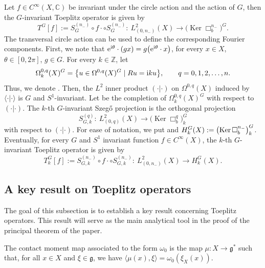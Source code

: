 \documentclass[pdftex]{sigma}
\numberwithin{equation}{section}
\newcommand{\To}{\rightarrow}
\begin{document}
	Let $f\in C^{\infty}(X, \mathbb{C})$ be invariant under the circle action and the action of $G$, then the $G$-invariant Toeplitz operator is given by
	\[T^G[f]:=S^{(n_-)}_G\circ f\cdot\circ S^{(n_-)}_G\colon\ L^2_{(0,n_-)}(X)\To\bigl(\operatorname{Ker}\Box^{n_-}_b\bigr)^G .
	\]
	The transversal circle action can be used to define the corresponding Fourier components. First, we note that
$
	{\rm e}^{{\rm i}\theta}\cdot (g x)=g \bigl( {\rm e}^{{\rm i}\theta}\cdot x\bigr)$, for every $ x\in X$, $ \theta\in[0,2\pi]$, $ g\in G$.
	For every $k\in\mathbb Z$, let
	\[\Omega^{0,q}_k(X)^G=\big\{u\in\Omega^{0,q}(X)^G \mid Ru={\rm i}k u\big\},\qquad q=0,1,2,\dots,n.
	\]
	Thus, we denote . Then, the $L^2$ inner product $( \cdot | \cdot )$ on $\Omega^{0,q}(X)$
	induced by~$\langle \cdot | \cdot \rangle$ is $G$ and $S^1$-invariant. Let  be
	the completion of $\Omega_k^{0,q}(X)^G$ with respect to~$( \cdot | \cdot )$.
	The $k$-th $G$-invariant Szeg\H{o} projection is the orthogonal projection
	\[S^{(q)}_{G,k}\colon\ L^2_{(0,q)}(X)\To \bigl(\operatorname{Ker}\Box^q_b\bigr)^G_k\]
	with respect to $( \cdot | \cdot )$. For ease of notation, we put
	and
$H^G_k(X):=\smash{\bigl(\operatorname{Ker}\Box^{n_-}_b\bigr)^G_k}$.
	Eventually, for every $G$ and $S^1$ invariant function $f\in{C}^\infty(X)$, the $k$-th $G$-invariant Toeplitz operator is given by
	\[%
		T^G_{k}[f]:=S^{(n_-)}_{G,k}\circ f\cdot\circ S^{(n_-)}_{G,k}\colon\ L^2_{(0,n_-)}(X)\To H^G_k(X) .
	\]
	
	 \subsection{A key result on Toeplitz operators}
	
	 The goal of this subsection is to establish a key result concerning Toeplitz operators. This result will serve as the main analytical tool in the proof of the principal theorem of the paper.
	
	 \begin{Definition}\label{d-gue170124}
	 	The contact moment map associated to the form $\omega_0$ is the map $\mu\colon X \to \mathfrak{g}^*$ such that, for all $x \in X$ and $\xi \in \mathfrak{g}$, we have
$\langle \mu(x), \xi \rangle = \omega_0(\xi_X(x))$.
	 \end{Definition}
\end{document}
